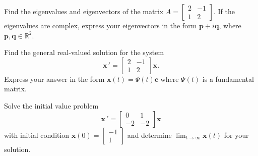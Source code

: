 \documentclass[11pt,letterpaper,boxed]{hmcpset}
\newcommand{\R}{\mathbb{R}}
\begin{document}
\begin{solution}
\vfill
\end{solution}
\newpage

\begin{problem}[5.] Find the eigenvalues and eigenvectors of the matrix $A = \begin{bmatrix} 2 & - 1 \\ 1 & 2 \end{bmatrix}$. If the eigenvalues are complex, express your eigenvectors in the form $\mathbf{p} + i \mathbf{q}$, where $\mathbf{p}, \mathbf{q} \in \R^2$.
\end{problem}

\begin{solution}
\vfill
\end{solution}
\newpage

\begin{problem}[6.]  
 Find the general real-valued solution for the system
\begin{equation}
\mathbf{x} \, ' = \begin{bmatrix} 2 & -1 \\ 1 & 2 \end{bmatrix} \mathbf{x}.
 \end{equation}
Express your answer in the form $\mathbf{x}(t) = \Psi(t) \mathbf{c}$ where $\Psi(t)$ is a fundamental matrix.
 \end{problem}
 
 \begin{solution}
\vfill
\end{solution}
\newpage  

\begin{problem}[7.] 
Solve the initial value problem 
\begin{equation}
\mathbf{x} \, ' = \begin{bmatrix} 0 & 1 \\ -2 & -2 \end{bmatrix} \mathbf{x}
\end{equation}
with initial condition $\mathbf{x}(0) =  \begin{bmatrix}  -1 \\ 1 \end{bmatrix}$ and determine $\displaystyle \lim_{t \to \infty}  \mathbf{x}(t)$ for your solution.
\end{problem}

\begin{solution}
\vfill
\end{solution}
\newpage
\end{document}
